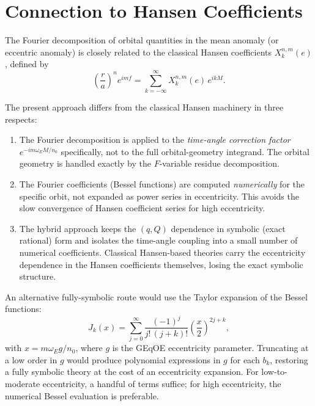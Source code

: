 \documentclass[11pt]{article}
\begin{document}
\section{Connection to Hansen Coefficients}
\label{sec:hansen}

The Fourier decomposition of orbital quantities in the mean anomaly (or
eccentric anomaly) is closely related to the classical Hansen coefficients
$X_k^{n,m}(e)$, defined by
\begin{equation}
\left(\frac{r}{a}\right)^n e^{imf}
= \sum_{k=-\infty}^{\infty} X_k^{n,m}(e)\, e^{ikM}.
\end{equation}

The present approach differs from the classical Hansen machinery in three
respects:
\begin{enumerate}
\item The Fourier decomposition is applied to the \emph{time-angle
correction factor} $e^{-im\omega_E M/n_0}$ specifically, not to the
full orbital-geometry integrand. The orbital geometry is handled exactly
by the $F$-variable residue decomposition.

\item The Fourier coefficients (Bessel functions) are computed
\emph{numerically} for the specific orbit, not expanded as power series
in eccentricity. This avoids the slow convergence of Hansen coefficient
series for high eccentricity.

\item The hybrid approach keeps the $(q, Q)$ dependence in symbolic
(exact rational) form and isolates the time-angle coupling into a small
number of numerical coefficients. Classical Hansen-based theories carry
the eccentricity dependence in the Hansen coefficients themselves,
losing the exact symbolic structure.
\end{enumerate}

An alternative fully-symbolic route would use the Taylor expansion of the
Bessel functions:
\begin{equation}
J_k(x) = \sum_{j=0}^{\infty}
\frac{(-1)^j}{j!\,(j+k)!}\left(\frac{x}{2}\right)^{2j+k},
\end{equation}
with $x = m\omega_E g / n_0$, where $g$ is the GEqOE eccentricity
parameter. Truncating at a low order in $g$ would produce polynomial
expressions in $g$ for each $b_k$, restoring a fully symbolic theory at
the cost of an eccentricity expansion. For low-to-moderate eccentricity,
a handful of terms suffice; for high eccentricity, the numerical Bessel
evaluation is preferable.
\end{document}
